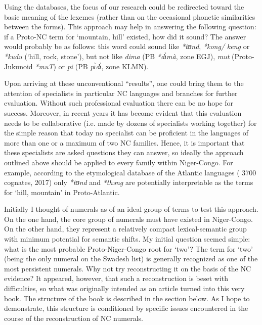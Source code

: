 Using the databases, the focus of our research could be redirected toward the basic meaning of the lexemes (rather than on the occasional phonetic similarities between the forms). This approach may help in answering the following question: if a Proto-NC term for ‘mountain, hill’ existed, how did it sound? The answer would probably be as follows: this word could sound like \textit{*tʊnd}, \textit{*kong/} \textit{keng} or \textit{*kudu} (‘hill, rock, stone’), but not like \textit{dima} (PB \textit{*d{\`{ɩ}}m{\`{a}}}, zone EGJ), \textit{mut} (Proto-Jukunoid \textit{*muT}) or \textit{pi} (PB \textit{p{\`{ɩ}}d{\`{ɩ}}}, zone KLMN). 

Upon arriving at these unconventional “results”, one could bring them to the attention of specialists in particular NC languages and branches for further evaluation. Without such professional evaluation there can be no hope for success.  Moreover, in recent years it has become evident that this evaluation needs to be collaborative (i.e. made by dozens of specialists working together) for the simple reason that today no specialist can be proficient in the languages of more than one or a maximum of two NC families. Hence, it is important that these specialists are asked questions they can answer, so ideally the approach outlined above should be applied to every family within Niger-Congo. For example, according to the etymological database of the Atlantic languages (\citealt{Pozdniakov-Segerer} 3700 cognates, 2017) only \textit{*t}\textit{ʊnd} and \textit{*th}\textit{əng} are potentially interpretable as the terms for ‘hill, mountain’ in Proto-Atlantic.

Initially I thought of numerals as of an ideal group of terms to test this approach. On the one hand, the core group of numerals must have existed in Niger-Congo. On the other hand, they represent a relatively compact lexical-semantic group with minimum potential for semantic shifts. My initial question seemed simple: what is the most probable Proto-Niger-Congo root for ‘two’? The term for ‘two’ (being the only numeral on the Swadesh list) is generally recognized as one of the most persistent numerals. Why not try reconstructing it on the basis of the NC evidence? It appeared, however, that such a reconstruction is beset with difficulties, so what was originally intended as an article turned into this very book. The structure of the book is described in the section below. As I hope to demonstrate, this structure is conditioned by specific issues encountered in the course of the reconstruction of NC numerals. 


